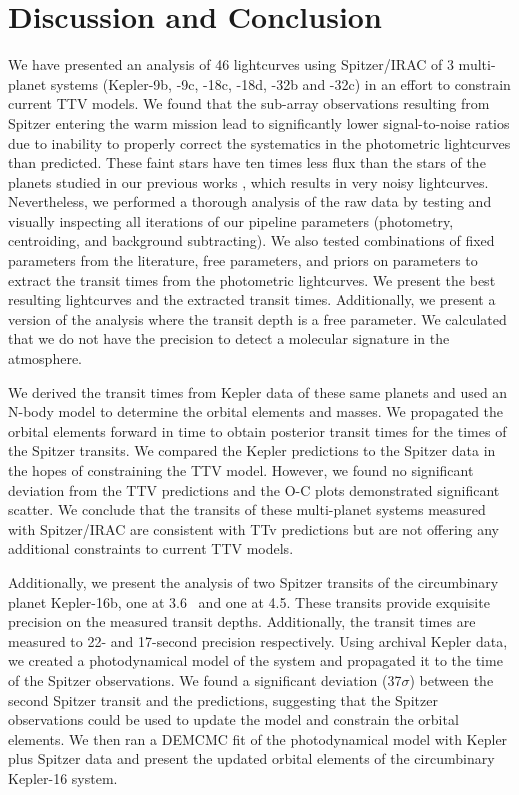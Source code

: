 \section{Discussion and Conclusion}

We have presented an analysis of 46 lightcurves using Spitzer/IRAC of 3 multi-planet systems (Kepler-9b, -9c, -18c, -18d, -32b and -32c) in an effort to constrain current TTV models. We found that the sub-array observations resulting from Spitzer entering the warm mission lead to significantly lower signal-to-noise ratios due to inability to properly correct the systematics in the photometric lightcurves than predicted. These faint stars have ten times less flux than the stars of the planets studied in our previous works \citep[e.g., see][]{Baxter2021}, which results in very noisy lightcurves. Nevertheless, we performed a thorough analysis of the raw data by testing and visually inspecting all iterations of our pipeline parameters (photometry, centroiding, and background subtracting). We also tested combinations of fixed parameters from the literature, free parameters, and priors on parameters to extract the transit times from the photometric lightcurves. We present the best resulting lightcurves and the extracted transit times. Additionally, we present a version of the analysis where the transit depth is a free parameter. We calculated that we do not have the precision to detect a molecular signature in the atmosphere.

We derived the transit times from Kepler data of these same planets and used an N-body model to determine the orbital elements and masses. We propagated the orbital elements forward in time to obtain posterior transit times for the times of the Spitzer transits. We compared the Kepler predictions to the Spitzer data in the hopes of constraining the TTV model. However, we found no significant deviation from the TTV predictions and the O-C plots demonstrated significant scatter. We conclude that the transits of these multi-planet systems measured with Spitzer/IRAC are consistent with TTv predictions but are not offering any additional constraints to current TTV models.

Additionally, we present the analysis of two Spitzer transits of the circumbinary planet Kepler-16b, one at 3.6\um~ and one at 4.5\um. These transits provide exquisite precision on the measured transit depths. Additionally, the transit times are measured to 22- and 17-second precision respectively. Using archival Kepler data, we created a photodynamical model of the system and propagated it to the time of the Spitzer observations. We found a significant deviation (37$\sigma$) between the second Spitzer transit and the predictions, suggesting that the Spitzer observations could be used to update the model and constrain the orbital elements. We then ran a DEMCMC fit of the photodynamical model with Kepler plus Spitzer data and present the updated orbital elements of the circumbinary Kepler-16 system.

